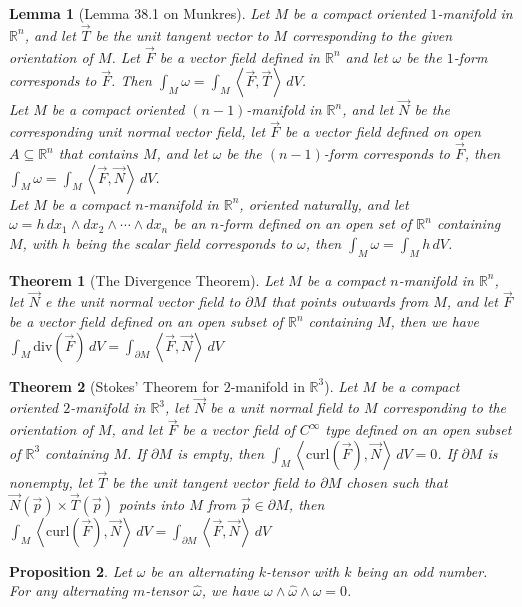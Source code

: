 \documentclass[9pt]{article}
\theoremstyle{break}
\theoremstyle{break}
\newtheorem{thm}{Theorem}[section]
\newtheorem{lem}{Lemma}[thm]
\newtheorem{prop}[lem]{Proposition}
\newcommand{\R}{\mathbb{R}}
\begin{document}
\begin{lem}[Lemma 38.1 on Munkres]
Let $M$ be a compact oriented $1$-manifold in $\R^n$, and let $\vec{T}$ be the unit tangent vector to $M$ corresponding to the given orientation of $M$. Let $\vec{F}$ be a vector field defined in $\R^n$ and let $\omega$ be the $1$-form corresponds to $\vec{F}$. Then $
\int_M \omega = \int_M \left< \vec{F}, \vec{T}\right> \, dV $.\\
Let $M$ be a compact oriented $(n-1)$-manifold in $\R^n$, and let $\vec{N}$ be the corresponding unit normal vector field, let $\vec{F}$ be a vector field defined on open $A\subseteq \R^n$ that contains $M$, and let $\omega$ be the $(n-1)$-form corresponds to $\vec{F}$, then $\int_M \omega = \int_M \left< \vec{F},\vec{N}\right> \, dV$.\\
Let $M$ be a compact $n$-manifold in $\R^n$, oriented naturally, and let $\omega = h\, dx_1 \wedge dx_2 \wedge \cdots \wedge dx_n$ be an $n$-form defined on an open set of $\R^n$ containing $M$, with $h$ being the scalar field corresponds to $\omega$, then $\int_M \omega = \int_M h\, dV$.
\end{lem}



\begin{thm}[The Divergence Theorem]
Let $M$ be a compact $n$-manifold in $\R^n$, let $\vec{N}$ e the unit normal vector field to $\partial M$ that points outwards from $M$, and let $\vec{F}$ be a vector field defined on an open subset of $\R^n$ containing $M$, then we have $\int_M \text{div}(\vec{F}) \, dV = \int_{\partial M}\left< \vec{F}, \vec{N}\right> \, dV$
\end{thm}

\begin{thm}[Stokes' Theorem for $2$-manifold in $\R^3$]
Let $M$ be a compact oriented $2$-manifold in $\R^3$, let $\vec{N}$ be a unit normal field to $M$ corresponding to the orientation of $M$, and let $\vec{F}$ be a vector field of $C^\infty$ type defined on an open subset of $\R^3$ containing $M$. If $\partial M$ is empty, then $\int_M \left< \text{curl}(\vec{F}),\vec{N}\right> \, dV = 0$.
If $\partial M$ is nonempty, let $\vec{T}$ be the unit tangent vector field to $\partial M$ chosen such that $\vec{N}(\vec{p}) \times \vec{T}(\vec{p})$ points into $M$ from $\vec{p}\in \partial M$, then $\int_M \left< \text{curl}(\vec{F}),\vec{N}\right> \, dV = \int_{\partial M}\left< \vec{F},\vec{N}\right>\, dV$
\end{thm}

\begin{prop}
Let $\omega$ be an alternating $k$-tensor with $k$ being an odd number. For any alternating $m$-tensor $\hat{\omega}$, we have $\omega\wedge \hat{\omega}\wedge\omega = 0$. 
\end{prop}
\end{document}
